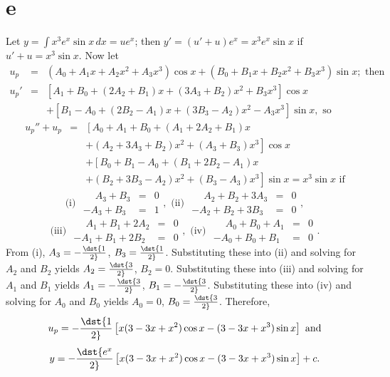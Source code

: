 \documentclass[dvips]{book}
\numberwithin{example}{section}
\numberwithin{equation}{section}
\numberwithin{theorem}{section}
\numberwithin{table}{section}
\numberwithin{figure}{section}
\begin{document}
\part{e} Let $y=\int x^3e^x\sin x\,dx=ue^x$; then
$y'=(u'+u)e^x=x^3e^x\sin x$ if $u'+u=x^3\sin x$. Now let
\begin{eqnarray*}
u_p&=&(A_0+A_1x+A_2x^2+A_3x^3)\cos x +(B_0+B_1x+B_2x^2+B_3x^3)\sin
x;\mbox{ then}\\
u_p'&=&\left[A_1+B_0+(2A_2+B_1)x+(3A_3+B_2)x^2+B_3x^3\right]\cos x\\
&&+\left[B_1-A_0+(2B_2-A_1)x+(3B_3-A_2)x^2-A_3x^3\right]\sin x,
\mbox{ so}
\end{eqnarray*}
\begin{eqnarray*}
u_p''+u_p&=&\left[A_0+A_1+B_0+(A_1+2A_2+B_1)x\right.\\
&&\left.+(A_2+3A_3+B_2)x^2
+(A_3+B_3)x^3\right]\cos x
\\ && +\left[B_0+B_1-A_0+(B_1+2B_2-A_1)x\right.\\
&&\left.+(B_2+3B_3-A_2)x^2
+(B_3-A_3)x^3\right]\sin x
=x^3\sin x \mbox{ if}
\end{eqnarray*}
$$
\mbox{(i) }
\begin{array}{rcl} \phantom{-}A_3+B_3&=&0\\ -A_3+B_3&=&1 \end{array},
\mbox{ (ii) }
\begin{array}{rcl} \phantom{-}A_2+B_2+3A_3&=&0\\ -A_2+B_2+3B_3&=&0
\end{array},
$$
$$
\mbox{(iii) }
\begin{array}{rcl}
\phantom{-}A_1+B_1+2A_2&=&0\\ -A_1+B_1+2B_2&=&0\end{array},
\mbox{ (iv) }
\begin{array}{rcl} \phantom{-}A_0+B_0+A_1&=&0\\ -A_0+B_0+B_1&=&0
\end{array}.
$$
From (i), $A_3=-\dst{1\over2}$, $B_3=\dst{1\over2}$. Substituting
these into (ii) and solving for $A_2$ and $B_2$ yields
$A_2=\dst{3\over2}$, $B_2=0$. Substituting these into (iii) and
solving for $A_1$ and $B_1$ yields $A_1=-\dst{3\over2}$,
$B_1=-\dst{3\over2}$. Substituting these into (iv) and solving for
$A_0$ and $B_0$ yields $A_0=0$, $B_0=\dst{3\over2}$. Therefore,
$$
u_p=-\dst{1\over2}\left[x(3-3x+x^2)\cos
x-(3-3x+x^3)\sin x\right] \mbox{ and}
$$
$$
y=-\dst{e^x\over2}\left[x(3-3x+x^2)\cos x-(3-3x+x^3)\sin x\right]+c.
$$
\end{document}

